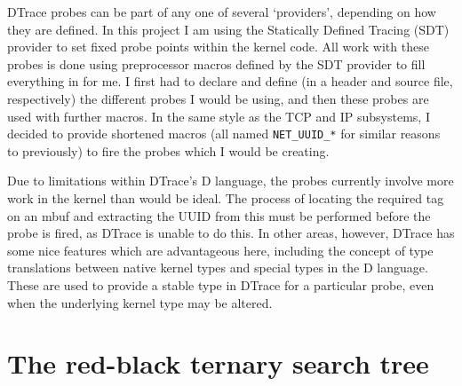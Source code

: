 \documentclass[a4paper,12pt,twoside,openright]{report}
\begin{document}
	DTrace probes can be part of any one of several `providers', depending on how they are defined. In this project I am using the Statically Defined Tracing (SDT) provider to set fixed probe points within the kernel code. All work with these probes is done using preprocessor macros defined by the SDT provider to fill everything in for me. I first had to declare and define (in a header and source file, respectively) the different probes I would be using, and then these probes are used with further macros. In the same style as the TCP and IP subsystems, I decided to provide shortened macros (all named \verb|NET_UUID_*| for similar reasons to previously) to fire the probes which I would be creating.
	
	Due to limitations within DTrace's D language, the probes currently involve more work in the kernel than would be ideal. The process of locating the required tag on an mbuf and extracting the UUID from this must be performed before the probe is fired, as DTrace is unable to do this. In other areas, however, DTrace has some nice features which are advantageous here, including the concept of type translations between native kernel types and special types in the D language. These are used to provide a stable type in DTrace for a particular probe, even when the underlying kernel type may be altered.
	
	\section{The red-black ternary search tree}
	\label{sec:TST-impl}
	
\end{document}
